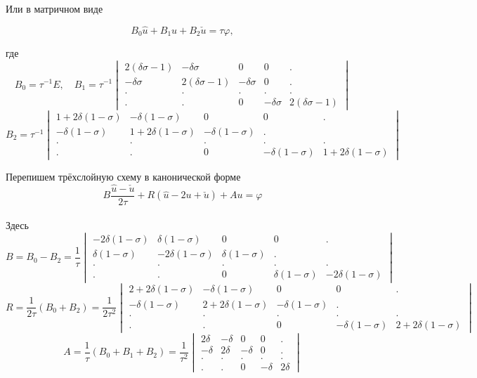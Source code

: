 \documentclass[12pt,a4paper]{article}
\begin{document}
Или в матричном виде 

$$B_0\hat{u}+B_1u+B_2\check{u} = \tau\varphi,$$

где $$ B_0 = \tau^{-1}E,\quad B_1 = \tau^{-1}\begin{vmatrix}
2(\delta\sigma-1) & -\delta\sigma & 0 & 0&.\\
-\delta\sigma & 2(\delta\sigma-1) & -\delta\sigma&0&.\\
.&.&.&.&.\\
.&.&0&-\delta\sigma & 2(\delta\sigma - 1)
\end{vmatrix}
$$
$$B_2 = \tau^{-1}\begin{vmatrix}
1 + 2\delta(1-\sigma) & -\delta(1-\sigma) & 0 & 0&.\\
-\delta(1-\sigma)  & 1 + 2\delta(1-\sigma)& -\delta(1-\sigma) &.\\
.&.&.&.&.\\
.&.&0&-\delta(1-\sigma) & 1 + 2\delta(1-\sigma)
\end{vmatrix}
$$

Перепишем трёхслойную схему в канонической форме
$$B\frac{\hat{u} - \check{u}}{2\tau} + R(\hat{u} - 2u + \check{u}) + Au = \varphi$$\\

Здесь $$B = B_0 - B_2 = \frac{1}{\tau}\begin{vmatrix}
- 2\delta(1-\sigma) & \delta(1-\sigma) & 0 & 0&.\\
\delta(1-\sigma)  & - 2\delta(1-\sigma)& \delta(1-\sigma) &.\\
.&.&.&.&.\\
.&.&0&\delta(1-\sigma) & - 2\delta(1-\sigma)
\end{vmatrix}$$
$$R = \frac{1}{2\tau}(B_0 + B_2) = \frac{1}{2\tau^2} \begin{vmatrix}
2 + 2\delta(1-\sigma) & -\delta(1-\sigma) & 0 & 0&.\\
-\delta(1-\sigma)  & 2 + 2\delta(1-\sigma)& -\delta(1-\sigma) &.\\
.&.&.&.&.\\
.&.&0&-\delta(1-\sigma) & 2 + 2\delta(1-\sigma)
\end{vmatrix}
$$
$$A = \frac{1}{\tau}(B_0 + B_1 + B_2) = \frac{1}{\tau^2} \begin{vmatrix}
2\delta & -\delta& 0 & 0&.\\
-\delta & 2\delta & -\delta&0&.\\
.&.&.&.&.\\
.&.&0&-\delta & 2\delta
\end{vmatrix}
$$
\end{document}
